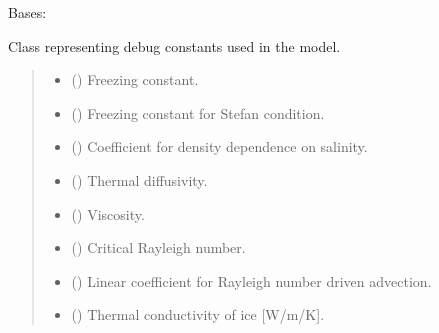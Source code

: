 \documentclass[a4paper,11pt,english,openany]{sphinxmanual}
\begin{document}
\begin{fulllineitems}
\label{\detokenize{api/spyice.parameters.debug_constants:spyice.parameters.debug_constants.DebugConstants}}
\pysigstartsignatures
{}
\pysigstopsignatures
\sphinxAtStartPar
Bases: 

\sphinxAtStartPar
Class representing debug constants used in the model.
\begin{quote}\begin{description}
\begin{itemize}
\item {} 
\sphinxAtStartPar
{} () \textendash{} Freezing constant.

\item {} 
\sphinxAtStartPar
{} () \textendash{} Freezing constant for Stefan condition.

\item {} 
\sphinxAtStartPar
{} () \textendash{} Coefficient for density dependence on salinity.

\item {} 
\sphinxAtStartPar
{} () \textendash{} Thermal diffusivity.

\item {} 
\sphinxAtStartPar
{} () \textendash{} Viscosity.

\item {} 
\sphinxAtStartPar
{} () \textendash{} Critical Rayleigh number.

\item {} 
\sphinxAtStartPar
{} () \textendash{} Linear coefficient for Rayleigh number driven advection.

\item {} 
\sphinxAtStartPar
{} () \textendash{} Thermal conductivity of ice {[}W/m/K{]}.


\end{itemize}
\end{description}
\end{quote}
\end{fulllineitems}
\end{document}
